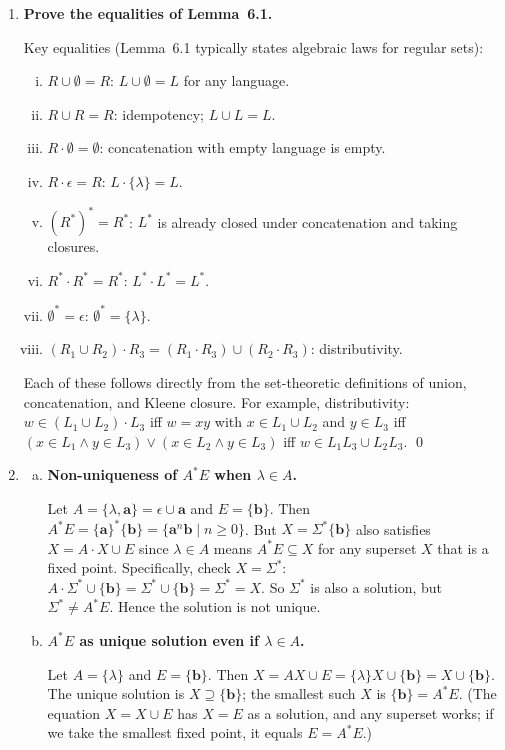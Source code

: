 \begin{enumerate}[{6.}1.]
\item \textbf{Prove the equalities of Lemma~6.1.}

Key equalities (Lemma~6.1 typically states algebraic laws for regular sets):

\begin{enumerate}[(i)]
  \item $R\cup\emptyset=R$: $L\cup\emptyset=L$ for any language.
  \item $R\cup R=R$: idempotency; $L\cup L=L$.
  \item $R\cdot\emptyset=\emptyset$: concatenation with empty language is empty.
  \item $R\cdot\epsilon=R$: $L\cdot\{\lambda\}=L$.
  \item $(R^*)^*=R^*$: $L^*$ is already closed under concatenation and taking closures.
  \item $R^*\cdot R^*=R^*$: $L^*\cdot L^*=L^*$.
  \item $\emptyset^*=\epsilon$: $\emptyset^*=\{\lambda\}$.
  \item $(R_1\cup R_2)\cdot R_3=(R_1\cdot R_3)\cup(R_2\cdot R_3)$: distributivity.
\end{enumerate}

Each of these follows directly from the set-theoretic definitions of union, concatenation, and Kleene closure.  For example, distributivity: $w\in(L_1\cup L_2)\cdot L_3$ iff $w=xy$ with $x\in L_1\cup L_2$ and $y\in L_3$ iff $(x\in L_1\wedge y\in L_3)\vee(x\in L_2\wedge y\in L_3)$ iff $w\in L_1L_3\cup L_2L_3$. \qed

\item \begin{enumerate}[(a)]
  \item \textbf{Non-uniqueness of $A^*E$ when $\lambda\in A$.}

  Let $A=\{\lambda,\pmb{a}\}=\epsilon\cup\pmb{a}$ and $E=\{\pmb{b}\}$.
  Then $A^*E=\{\pmb{a}\}^*\{\pmb{b}\}=\{\pmb{a}^n\pmb{b}\mid n\ge 0\}$.
  But $X=\Sigma^*\{\pmb{b}\}$ also satisfies $X=A\cdot X\cup E$ since $\lambda\in A$ means $A^*E\subseteq X$ for any superset $X$ that is a fixed point.  Specifically, check $X=\Sigma^*$: $A\cdot\Sigma^*\cup\{\pmb{b}\}=\Sigma^*\cup\{\pmb{b}\}=\Sigma^*=X$.  So $\Sigma^*$ is also a solution, but $\Sigma^*\neq A^*E$.  Hence the solution is not unique.

  \item \textbf{$A^*E$ as unique solution even if $\lambda\in A$.}

  Let $A=\{\lambda\}$ and $E=\{\pmb{b}\}$.  Then $X=AX\cup E=\{\lambda\}X\cup\{\pmb{b}\}=X\cup\{\pmb{b}\}$.  The unique solution is $X\supseteq\{\pmb{b}\}$; the smallest such $X$ is $\{\pmb{b}\}=A^*E$.  (The equation $X=X\cup E$ has $X=E$ as a solution, and any superset works; if we take the smallest fixed point, it equals $E=A^*E$.)
\end{enumerate}


\end{enumerate}
